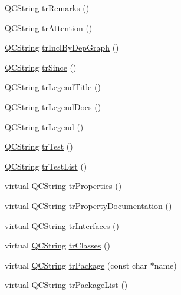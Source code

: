 \begin{DoxyCompactItemize}
\hyperlink{class_q_c_string}{Q\+C\+String} \hyperlink{class_translator_polish_aab5b62496303678a3170604c73747034}{tr\+Remarks} ()
\item 
\hyperlink{class_q_c_string}{Q\+C\+String} \hyperlink{class_translator_polish_a54f663d0f469e53af0734c4f717fd486}{tr\+Attention} ()
\item 
\hyperlink{class_q_c_string}{Q\+C\+String} \hyperlink{class_translator_polish_aa36f3d8d16d6aca68f2310ddd5f0c8bc}{tr\+Incl\+By\+Dep\+Graph} ()
\item 
\hyperlink{class_q_c_string}{Q\+C\+String} \hyperlink{class_translator_polish_a0d4ce346ceab52ae03ee6770748d6298}{tr\+Since} ()
\item 
\hyperlink{class_q_c_string}{Q\+C\+String} \hyperlink{class_translator_polish_ab03d82c93f5ba3eb12ce7dcc2481249f}{tr\+Legend\+Title} ()
\item 
\hyperlink{class_q_c_string}{Q\+C\+String} \hyperlink{class_translator_polish_a0b2b7c31dea5cec7a2419404276e65f2}{tr\+Legend\+Docs} ()
\item 
\hyperlink{class_q_c_string}{Q\+C\+String} \hyperlink{class_translator_polish_aab45a1ee516e7e1bccfc3d583bfb4ab1}{tr\+Legend} ()
\item 
\hyperlink{class_q_c_string}{Q\+C\+String} \hyperlink{class_translator_polish_aad254fed5e66326eb597796325207be8}{tr\+Test} ()
\item 
\hyperlink{class_q_c_string}{Q\+C\+String} \hyperlink{class_translator_polish_ab08b331b46f12531653bd2933328c57a}{tr\+Test\+List} ()
\item 
virtual \hyperlink{class_q_c_string}{Q\+C\+String} \hyperlink{class_translator_polish_a6f0eb5ca63099a11f7117e427760efb7}{tr\+Properties} ()
\item 
virtual \hyperlink{class_q_c_string}{Q\+C\+String} \hyperlink{class_translator_polish_ab646ef6a01416499a16c0324f0174638}{tr\+Property\+Documentation} ()
\item 
virtual \hyperlink{class_q_c_string}{Q\+C\+String} \hyperlink{class_translator_polish_a9e7ec9037ad79c76607b29fc953bc6e5}{tr\+Interfaces} ()
\item 
virtual \hyperlink{class_q_c_string}{Q\+C\+String} \hyperlink{class_translator_polish_addab87a21d11341baa38eabe20b70507}{tr\+Classes} ()
\item 
virtual \hyperlink{class_q_c_string}{Q\+C\+String} \hyperlink{class_translator_polish_a90be77db4f73def98c3e2b462c505500}{tr\+Package} (const char $\ast$name)
\item 
virtual \hyperlink{class_q_c_string}{Q\+C\+String} \hyperlink{class_translator_polish_a73e66fde6e101c7206ad85184ae8550b}{tr\+Package\+List} ()

\end{DoxyCompactItemize}

